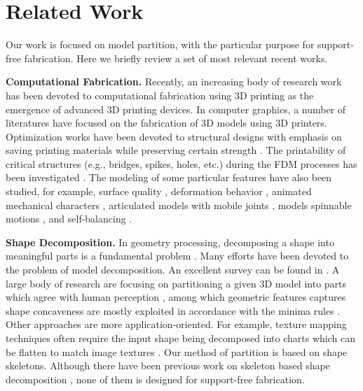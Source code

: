 \section{Related Work}

Our work is focused on model partition, with the particular purpose for support-free fabrication. Here we briefly review a set of most relevant recent works.

\textbf{Computational Fabrication.} Recently, an increasing body of research work has been devoted to computational fabrication using 3{D} printing as the emergence of advanced 3{D} printing devices. In computer graphics, a number of literatures have focused on the fabrication of 3{D} models using 3{D} printers. Optimization works have been devoted to structural designs with emphasis on saving printing materials while preserving certain strength \cite{StavaVBCM12,ZhouPZ13,WangWYLTTDCL13,Umetani:2013:CSA,wang2013cost,LuSZWFCSTCC14,hornus2015tight,xie2017support}. {\color{blue}The printability of critical structures (e.g., bridges, spikes, holes, etc.) during the FDM processes has been investigated \cite{telea2011voxel,DumasHL14}}. The modeling of some particular features have also been studied, for example, surface quality \cite{wang2016improved}, deformation behavior \cite{SkourasTCBG13}, animated mechanical characters \cite{CorosTNSFSMB13,CeylanLMAP13}, articulated models with mobile joints \cite{BacherBJP12,CaliCAKSKW12}, models spinnable motions \cite{Bacher14}, and self-balancing \cite{PrevostWLS13}.

\textbf{Shape Decomposition.} In geometry processing, decomposing a shape into meaningful parts is a fundamental problem \cite{Kaick:2014:SSA}. Many efforts have been devoted to the problem of model decomposition. An excellent survey can be found in \cite{Shamir08}. A large body of research are focusing on partitioning a given 3{D} model into parts which agree with human perception \cite{KatzT03,KatzLT05,JiLCW06,LiuZ07,Golovinskiy:2008,ChenGF09,KaickFKAC14}, among which geometric features captures shape concaveness are mostly exploited in accordance with the minima rules \cite{hoffman1984parts,hoffman1997salience}. Other approaches are more application-oriented. For example, texture mapping techniques often require the input shape being decomposed into charts which can be flatten to match image textures \cite{zhou2004iso,Garcia:2008:IIG}. Our method of partition is based on shape skeletons. Although there have been previous work on skeleton based shape decomposition \cite{lien2006simultaneous,reniers2007skeleton,AuTCCL08}, none of them is designed for support-free fabrication.


